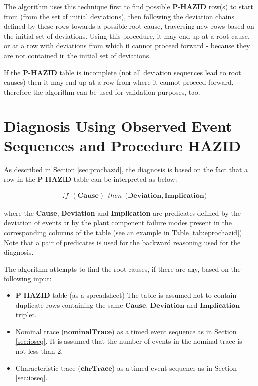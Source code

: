 \documentclass[conference]{IEEEtran}
\begin{document}
The algorithm uses this technique first to find possible  $\textbf{P-HAZID}$ row(s) to start from (from the set of initial deviations), then following the deviation chains defined by these rows towards a possible root cause, traversing new rows based on the initial set of deviations. Using this procedure, it may end up at a root cause, or at a row with deviations from which it cannot proceed forward - because they are not contained in the initial set of deviations. 

If the $\textbf{P-HAZID}$ table is incomplete (not all deviation sequences lead to root causes) then it may end up at a row from where it cannot proceed forward, therefore the algorithm can be used for validation purposes, too. 

%
\section{Diagnosis Using Observed Event Sequences and Procedure HAZID}
\label{sec:reasoning}

As described in Section \ref{sec:prochazid}, the diagnosis is based on the fact that a row in the $\textbf{P-HAZID}$
table can be interpreted as below:
\begin{small}
\begin{eqnarray*}
&& If~~\mathbf{(Cause)}~~then~~\mathbf{(Deviation,Implication})
\end{eqnarray*}
\end{small}
\noindent where the \textbf{Cause}, \textbf{Deviation} and \textbf{Implication}
 are predicates
 defined by the deviation of events or by the plant component failure modes
present in the corresponding columns of the table (see an example in Table \ref{tab:eprochazid}).
Note that a pair of predicates is used for the backward reasoning used for the diagnosis.

 
The algorithm attempts to find the root causes, if there are any, based on the following input:
\begin{itemize}
	\item $\textbf{P-HAZID}$ table (as a spreadsheet) The table is assumed not to contain duplicate rows containing the same $\mathbf{Cause}$, $\mathbf{Deviation}$ and $\mathbf{Implication}$ triplet.
	\item Nominal trace ($\mathbf{nominalTrace}$) as a timed event sequence as in Section \ref{sec:ioseq}. It is assumed that the number of events in the nominal trace is not less than 2.
	\item Characteristic trace ($\mathbf{chrTrace}$) as a timed event sequence as in Section \ref{sec:ioseq}.
\end{itemize}
\end{document}
